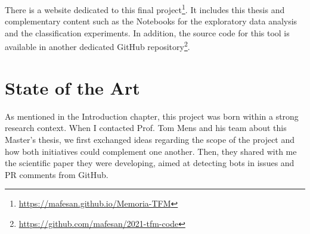 \documentclass[a4paper, 12pt]{book}
\begin{document}
There is a website dedicated to this final project\footnote{\url{https://mafesan.github.io/Memoria-TFM}}. It includes this thesis and complementary content such as the Notebooks for the exploratory data analysis and the classification experiments. In addition, the source code for this tool is available in another dedicated GitHub repository\footnote{\url{https://github.com/mafesan/2021-tfm-code}}.



\cleardoublepage


\chapter{State of the Art}               %
\label{chap:state-art}

As mentioned in the Introduction chapter, this project was born within a strong research context. When I contacted Prof. Tom Mens and his team about this Master's thesis, we first exchanged ideas regarding the scope of the project and how both initiatives could complement one another. Then, they shared with me the scientific paper they were developing, aimed at detecting bots in issues and PR comments from GitHub.
\end{document}
